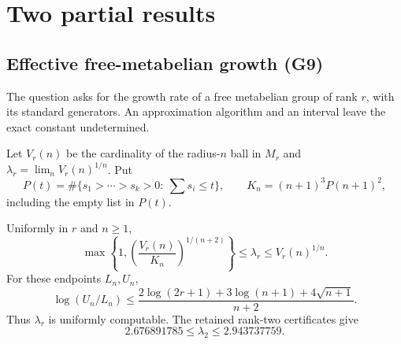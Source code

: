 \section{Two partial results}\label{sec:partial}

\subsection{Effective free-metabelian growth (G9)}\label{sec:g9}
The question asks for the growth rate of a free metabelian group of
rank $r$, with its standard generators. An approximation algorithm and
an interval leave the exact constant undetermined.

Let $V_r(n)$ be the cardinality of the radius-$n$ ball in $M_r$ and
$\lambda_r=\lim_n V_r(n)^{1/n}$. Put
\[
 P(t)=\#\{s_1>\cdots>s_k>0:\ \sum s_i\le t\},\qquad
 K_n=(n+1)^3P(n+1)^2,
\]
including the empty list in $P(t)$.

\begin{theorem}\label{prop:g9}
Uniformly in $r$ and $n\ge1$,
\begin{equation}\label{eq:growth-bounds}
 \max\left\{1,\left(\frac{V_r(n)}{K_n}\right)^{1/(n+2)}\right\}
 \le\lambda_r\le V_r(n)^{1/n}.
\end{equation}
For these endpoints $L_n,U_n$,
\begin{equation}\label{eq:growth-modulus}
 \log(U_n/L_n)\le
 \frac{2\log(2r+1)+3\log(n+1)+4\sqrt{n+1}}{n+2}.
\end{equation}
Thus $\lambda_r$ is uniformly computable. The retained rank-two
certificates give
\[
 \boxed{2.676891785\le\lambda_2\le2.943737759.}
\]
\end{theorem}

